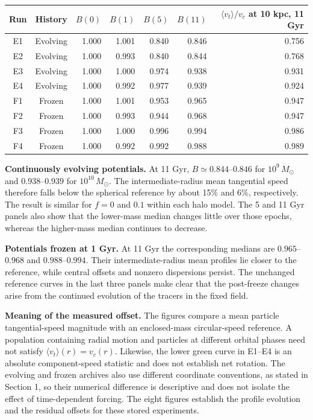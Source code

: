 \documentclass[a4paper,11pt]{article}
\newcommand{\Msun}{M_{\odot}}
\newcommand{\vtmean}{\langle v_t\rangle}
\begin{document}
\begin{center}\small
\begin{tabular}{@{}ccrrrrr@{}}
\toprule
Run & History & $B(0)$ & $B(1)$ & $B(5)$ & $B(11)$ &
$\vtmean/v_c$ at 10 kpc, 11 Gyr\\
\midrule
E1 & Evolving & 1.000 & 1.001 & 0.840 & 0.846 & 0.756\\
E2 & Evolving & 1.000 & 0.993 & 0.840 & 0.844 & 0.768\\
E3 & Evolving & 1.000 & 1.000 & 0.974 & 0.938 & 0.931\\
E4 & Evolving & 1.000 & 0.992 & 0.977 & 0.939 & 0.924\\
F1 & Frozen & 1.000 & 1.001 & 0.953 & 0.965 & 0.947\\
F2 & Frozen & 1.000 & 0.993 & 0.944 & 0.968 & 0.947\\
F3 & Frozen & 1.000 & 1.000 & 0.996 & 0.994 & 0.986\\
F4 & Frozen & 1.000 & 0.992 & 0.992 & 0.988 & 0.989\\
\bottomrule
\end{tabular}
\end{center}

\textbf{Continuously evolving potentials.}
At 11 Gyr, $B\simeq0.844$--$0.846$ for $10^9\,\Msun$ and
$0.938$--$0.939$ for $10^{10}\,\Msun$. The intermediate-radius
mean tangential speed therefore falls below the spherical reference by
about 15\% and 6\%, respectively. The result is similar for $f=0$ and
$0.1$ within each halo model. The 5 and 11 Gyr panels also show that
the lower-mass median changes little over those epochs, whereas the
higher-mass median continues to decrease.

\textbf{Potentials frozen at 1 Gyr.}
At 11 Gyr the corresponding medians are $0.965$--$0.968$ and
$0.988$--$0.994$. Their intermediate-radius mean profiles lie closer to
the reference, while central offsets and nonzero dispersions persist.
The unchanged reference curves in the last three panels make clear that
the post-freeze changes arise from the continued evolution of the tracers
in the fixed field.

\textbf{Meaning of the measured offset.}
The figures compare a mean particle tangential-speed magnitude with an
enclosed-mass circular-speed reference. A population containing radial
motion and particles at different orbital phases need not satisfy
$\vtmean(r)=v_c(r)$. Likewise, the lower green curve in E1--E4 is an
absolute component-speed statistic and does not establish net rotation.
The evolving and frozen archives also use different coordinate
conventions, as stated in Section 1, so their numerical difference is
descriptive and does not isolate the effect of time-dependent forcing.
The eight figures establish the profile evolution and the residual
offsets for these stored experiments.
\end{document}
